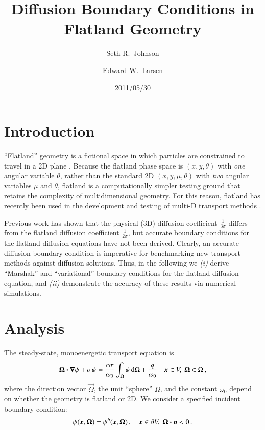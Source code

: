 \documentclass{anstrans}
\title{Diffusion Boundary Conditions in Flatland Geometry}
\author{Seth R.~Johnson \and Edward W.~Larsen}
\institute{Department of Nuclear Engineering \& Radiological Sciences, University of Michigan, Ann Arbor, MI, 48109}
\date{2011/05/30}
\begin{document}
\section{Introduction}
``Flatland'' geometry is a fictional space in which particles are constrained to
travel in a 2D plane \cite{Asa2008}. Because the flatland phase space is
$(x,y,\theta)$ with \emph{one} angular variable $\theta$, rather than the
standard 2D $(x,y,\mu,\theta)$ with \emph{two} angular variables $\mu$ and
$\theta$, flatland is a computationally simpler testing ground that retains the
complexity of multidimensional geometry. For this reason, flatland has recently
been used in the development and testing of multi-D transport methods
\cite{Lar2009c,Joh2011,Tra2011}.

Previous work has shown that the physical (3D) diffusion coefficient
$\frac{1}{3\sigma}$ differs from the flatland diffusion coefficient
$\frac{1}{2\sigma}$, but accurate boundary conditions for the flatland
diffusion equations have not been derived. Clearly, an accurate diffusion
boundary condition is imperative for benchmarking new transport methods against
diffusion solutions. Thus, in the following we \textsl{(i)} derive ``Marshak''
and ``variational'' boundary conditions for the flatland diffusion equation,
and \textsl{(ii)} demonstrate the accuracy of these results via numerical
simulations. 

\section{Analysis}
The steady-state, monoenergetic transport equation is
\begin{equation}\label{eq:generalTransport}
  \bm{\Omega}\bm{\cdot} \bm{\nabla} \psi + \sigma \psi
  = \frac{c \sigma}{\omega_0} \int_{\Omega} \psi \mathop{}\!\mathrm{d}\Omega + \frac{q}{\omega_0}
  \quad \bm{x}\in V,\ \bm{\Omega}\in \Omega \,,
\end{equation}
where the direction vector $\vec{\Omega}$, the unit ``sphere'' $\Omega$, and
the constant $\omega_0$ depend on whether the geometry
is flatland or 2D. We consider a specified incident boundary condition:
\begin{equation} \label{eq:ssBndy}
  \psi(\bm{x}, \bm{\Omega}) = \psi^b(\bm{x}, \bm{\Omega})\,,
  \quad \bm{x}\in \partial V,\ \bm{\Omega} \bm{\cdot} \bm{n} < 0\,.
\end{equation}
\end{document}
